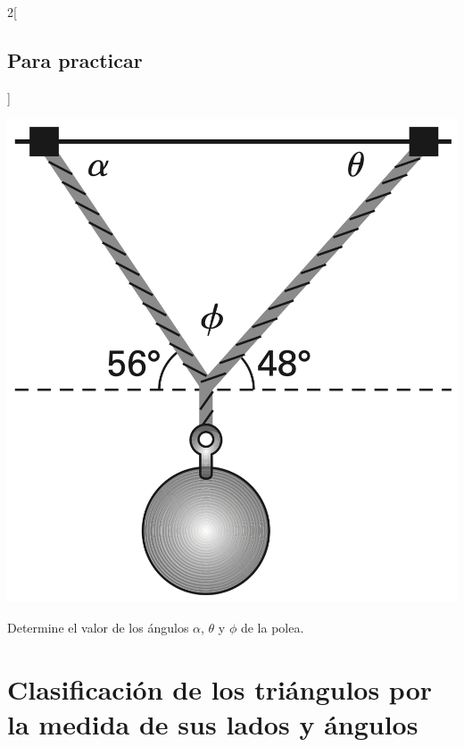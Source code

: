 \documentclass{sn-guia}
\begin{document}
\begin{multicols}{2}[\subsection*{Para practicar}]
    \begin{center} 
        \includegraphics[width=0.6\linewidth]{polea.png}
    \end{center}
    Determine el valor de los ángulos $\alpha$, $\theta$ y $\phi$ de la polea.
    \begin{respuesta}[height=1.5cm]
    \end{respuesta}
\end{multicols}

%

\section*{Clasificación de los triángulos por la medida de sus lados y ángulos}
\end{document}
